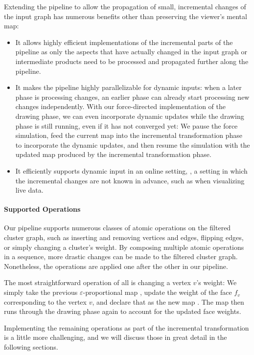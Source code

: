 Extending the pipeline to allow the propagation of small, incremental changes of the input graph has numerous benefits other than preserving the viewer's mental map:
%
\begin{itemize}
\item It allows highly efficient implementations of the incremental parts of the pipeline as only the aspects that have actually changed in the input graph or intermediate products need to be processed and propagated further along the pipeline.
\item It makes the pipeline highly parallelizable for dynamic inputs: when a later phase is processing changes, an earlier phase can already start processing new changes independently.
With our force-directed implementation of the drawing phase, we can even incorporate dynamic updates while the drawing phase is still running, even if it has not converged yet:
We pause the force simulation, feed the current map  into the incremental transformation phase to incorporate the dynamic updates, and then resume the simulation with the updated map  produced by the incremental transformation phase.
\item It efficiently supports dynamic input in an online setting, \ie{}, a setting in which the incremental changes are not known in advance, such as when visualizing live data.
\end{itemize}



\paragraph{Supported Operations}

Our pipeline supports numerous classes of atomic operations on the filtered cluster graph, such as inserting and removing vertices and edges, flipping edges, or simply changing a cluster's weight.
By composing multiple atomic operations in a sequence, more drastic changes can be made to the filtered cluster graph.
Nonetheless, the operations are applied one after the other in our pipeline.

The most straightforward operation of all is changing a vertex $v$'s weight:
We simply take the previous $\varepsilon$-proportional map , update the weight of the face $f_v$ corresponding to the vertex $v$, and declare that as the new map .
The map  then runs through the drawing phase again to account for the updated face weights.

Implementing the remaining operations as part of the incremental transformation is a little more challenging, and we will discuss those in great detail in the following sections.

\clearpage

\clearpage

\clearpage


